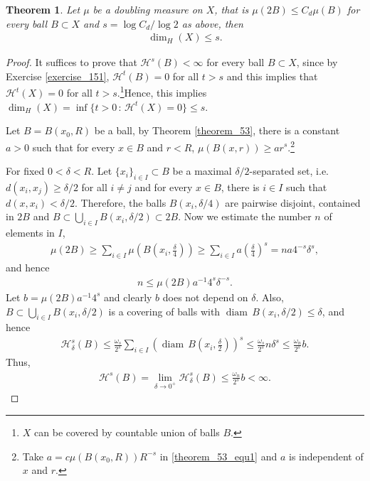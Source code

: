 \documentclass[11pt]{book}
\newtheorem{theorem}{Theorem}[chapter]
\theoremstyle{definition}
\numberwithin{equation}{chapter}
\def\H{{\mathcal H}}
\def\diam{{\operatorname{diam}\,}}
\begin{document}
\begin{theorem}
Let $\mu$ be a doubling measure on $X$, that is $\mu(2B) \leq C_d \mu(B)$ for every ball $B \subset X$ and $s = \log C_d/\log 2$ as above, then 
\begin{align*}
    \dim_{H}(X) \leq s.
\end{align*}
\end{theorem}
\begin{proof}
It suffices to prove that $\H^s(B) < \infty$ for every ball $B \subset X$, since by Exercise \ref{exercise_151}, $\H^t(B) = 0$ for all $t > s$ and this implies that $\H^t(X) = 0$ for all $t > s$.\footnote{$X$ can be covered by countable union of balls $B$.}Hence, this implies $\dim_H(X) = \inf\{t > 0 \,:\, \H^t(X) = 0\} \leq s$.

Let $B = B(x_0,R)$ be a ball, by Theorem \ref{theorem_53}, there is a constant $a > 0$ such that for every $x \in B$ and $r < R$, $\mu(B(x,r)) \geq a r^s$.\footnote{Take $a = c \mu(B(x_0,R))R^{-s}$ in \eqref{theorem_53_equ1} and $a$ is independent of $x$ and $r$.}

For fixed $0 < \delta < R$. Let $\{x_i\}_{i\in I} \subset B$ be a maximal $\delta/2$-separated set, i.e. $d(x_i,x_j) \geq \delta/2$ for all $i \neq j$ and for every $x \in B$, there is $i \in I$ such that $d(x,x_i) < \delta/2$. Therefore, the balls $B(x_i,\delta/4)$ are pairwise disjoint, contained in $2B$ and $B \subset \bigcup_{i\in I}B(x_i,\delta/2) \subset 2B$. Now we estimate the number $n$ of elements in $I$, 
\begin{align*}
    \mu(2B) \geq \sum_{i\in I} \mu\left(B\left(x_i, \frac{\delta}{4}\right)\right) \geq \sum_{i\in I} a \left(\frac{\delta}{4}\right)^s = n a 4^{-s} \delta^s,
\end{align*}
and hence
\begin{align*}
    n \leq \mu(2B) a^{-1} 4^s \delta^{-s}.
\end{align*}
Let $b = \mu(2B) a^{-1} 4^s$ and clearly $b$ does not depend on $\delta$. Also, $B \subset \bigcup_{i\in I}B(x_i,\delta/2)$ is a covering of balls with $\diam B(x_i,\delta/2) \leq \delta$, and hence
\begin{align*}
    \H^s_\delta(B) \leq \frac{\omega_s}{2^s} \sum_{i\in I} \left(\diam B\left(x_i, \frac{\delta}{2}\right)\right)^s \leq \frac{\omega_s}{2^s} n \delta^s \leq \frac{\omega_n}{2^s}b.
\end{align*}
Thus,
\begin{align*}
    \H^s(B) = \lim_{\delta\to 0^+} \H^s_\delta(B) \leq \frac{\omega_n}{2^s}b < \infty.
\end{align*}
\end{proof}
\end{document}

